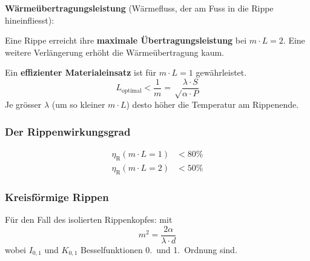 			\textbf{Wärmeübertragungsleistung} (Wärmefluss, der am Fuss in die Rippe hineinfliesst):
			
			Eine Rippe erreicht ihre \textbf{maximale Übertragungsleistung} bei $m\cdot L = 2$. Eine weitere Verlängerung erhöht die Wärme\-über\-tragung kaum.
			
			Ein \textbf{effizienter Materialeinsatz} ist für $m\cdot L = 1$ gewähr\-leistet.
			\[
				L_\text{optimal} < \frac{1}{m} = \sqrt \frac{\lambda \cdot S}{\alpha \cdot P}
			\]
			Je grösser $\lambda$ (um so kleiner $m\cdot L$) desto höher die Temperatur am Rippenende.
		\subsubsection{Der Rippenwirkungsgrad} %
			\begin{align*}
				\eta_\text{R}(m\cdot L = 1) &< 80\% \\
				\eta_\text{R}(m\cdot L = 2) &< 50\%
			\end{align*}
		\subsubsection{Kreisförmige Rippen} %
			Für den Fall des isolierten Rippenkopfes:
			mit \[
				m^2 = \frac{2\alpha}{\lambda \cdot d}
			\]
			wobei $I_{0,1}$ und $K_{0,1}$ Besselfunktionen 0.~und 1.~Ordnung sind.
